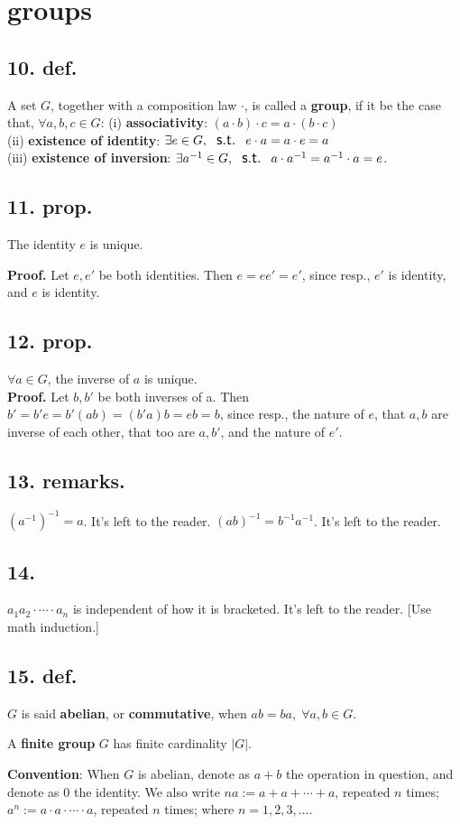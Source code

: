 \documentclass[12pt]{article}
\newcommand\M\cdot%
\newcommand\Ev\forall%
\newcommand\Ex\exists%
\newcommand\St{\textsf{\large \: s.t. \:}}%
\newcommand{\Ss}[1]{\textsf{\textbf{#1}}}%
\begin{document}
\section{groups}
\subsection*{10. def.} A set \(G\), together with a composition law \(\M\), is called a \Ss{group}, if it be the case that, \(\Ev a,b,c \in G\):
\indent (i) \Ss{associativity}:  \( (a \M b) \M c = a \M (b\M c) \) \\
\indent (ii) \Ss{existence of identity}: \( \Ex e \in G, \St e\M a = a\M e = a\) \\
\indent (iii) \Ss{existence of inversion}: \( \Ex a^{-1} \in G, \St a\M a^{-1} = a^{-1} \M a = e \).

\subsection*{11. prop.} The identity \(e\) is unique. \par
\Ss{Proof.} Let \(e, e'\) be both identities. 
Then \(e = ee' = e'\), 
since resp., \(e'\) is identity, and \(e\) is identity.

\subsection*{12. prop.} \(\Ev a \in G\), the inverse of \(a\) is unique. \\
\indent \Ss{Proof.} Let \(b, b'\) be both inverses of a. 
Then \(b' = b'e = b'(ab) = (b'a)b = eb = b\), 
since resp., the nature of \(e\), that \(a,b\) are inverse of each other, that too are \(a,b'\), and the nature of \(e'\). 

\subsection*{13. remarks.} \( (a^{-1})^{-1} = a \). It's left to the reader.
\( (ab)^{-1} = b^{-1}a^{-1} \). It's left to the reader.

\subsection*{14.} \( a_1 a_2 \M \dotsb \M a_n \) is independent of how it is bracketed.  It's left to the reader. [Use math induction.]

\subsection*{15. def.} \(G\) is said \Ss{abelian}, or \Ss{commutative}, when \( ab = ba,\; \Ev a,b \in G \). \par
A \Ss{finite group} \(G\) has finite cardinality \(|G|\). \par
\Ss{Convention}: When \(G\) is abelian, denote as \(a+b\) the operation in question, and denote as 0 the identity. 
We also write \(na := a+a+\dotsb+a\), repeated \(n\) times; 
\(a^n := a \M a \M\dotsb\M a\), repeated \(n\) times; 
where \(n=1,2,3,\dotsc\). 
\end{document}
